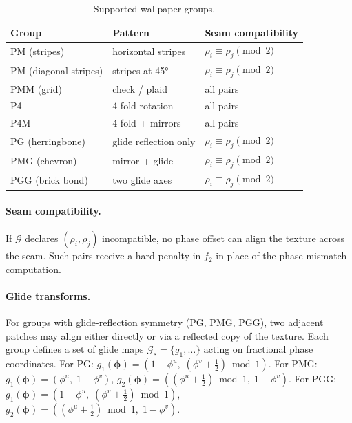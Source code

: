 \documentclass[runningheads]{llncs}
\begin{document}
\begin{table}[h]
\centering
\caption{Supported wallpaper groups.}
\label{tab:wallpaper}
\begin{tabular}{lll}
\hline
Group & Pattern & Seam compatibility \\
\hline
PM (stripes)          & horizontal stripes      & $\rho_i \equiv \rho_j \pmod{2}$ \\
PM (diagonal stripes) & stripes at 45°          & $\rho_i \equiv \rho_j \pmod{2}$ \\
PMM (grid)            & check / plaid           & all pairs \\
P4                    & 4-fold rotation         & all pairs \\
P4M                   & 4-fold + mirrors        & all pairs \\
PG  (herringbone)     & glide reflection only   & $\rho_i \equiv \rho_j \pmod{2}$ \\
PMG (chevron)         & mirror + glide          & $\rho_i \equiv \rho_j \pmod{2}$ \\
PGG (brick bond)      & two glide axes          & $\rho_i \equiv \rho_j \pmod{2}$ \\
\hline
\end{tabular}
\end{table}

\paragraph{Seam compatibility.}
If $\mathcal{G}$ declares $(\rho_i, \rho_j)$ incompatible, no phase offset can align
the texture across the seam.
Such pairs receive a hard penalty in $f_2$ in place of the phase-mismatch computation.

\paragraph{Glide transforms.}
For groups with glide-reflection symmetry (PG, PMG, PGG),
two adjacent patches may align either directly or via a reflected copy of the texture.
Each group defines a set of glide maps $\mathcal{G}_s = \{g_1, \dots\}$ acting on
fractional phase coordinates.
For PG: $g_1(\boldsymbol{\phi}) = (1{-}\phi^u,\; (\phi^v{+}\tfrac{1}{2})\bmod 1)$.
For PMG: $g_1(\boldsymbol{\phi}) = (\phi^u,\; 1{-}\phi^v)$,\;
         $g_2(\boldsymbol{\phi}) = ((\phi^u{+}\tfrac{1}{2})\bmod 1,\; 1{-}\phi^v)$.
For PGG: $g_1(\boldsymbol{\phi}) = (1{-}\phi^u,\; (\phi^v{+}\tfrac{1}{2})\bmod 1)$,\;
         $g_2(\boldsymbol{\phi}) = ((\phi^u{+}\tfrac{1}{2})\bmod 1,\; 1{-}\phi^v)$.
\end{document}
